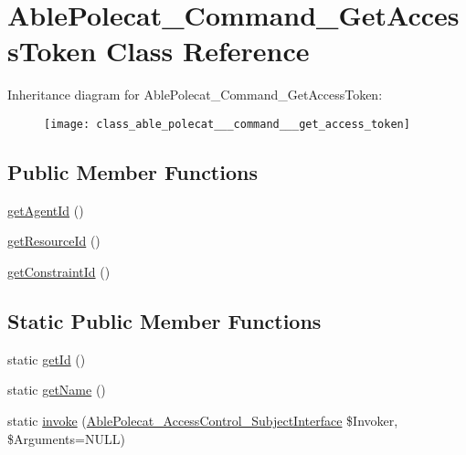 \hypertarget{class_able_polecat___command___get_access_token}{}\section{Able\+Polecat\+\_\+\+Command\+\_\+\+Get\+Access\+Token Class Reference}
\label{class_able_polecat___command___get_access_token}
Inheritance diagram for Able\+Polecat\+\_\+\+Command\+\_\+\+Get\+Access\+Token\+:\begin{figure}[H]
\begin{center}
\leavevmode
\texttt{[image: class\_able\_polecat\_\_\_command\_\_\_get\_access\_token]}
\end{center}
\end{figure}
\subsection*{Public Member Functions}
\begin{DoxyCompactItemize}
\item 
\hyperlink{class_able_polecat___command___get_access_token_a674eb8d41b003dc1c17e4296a8c9e9f8}{get\+Agent\+Id} ()
\item 
\hyperlink{class_able_polecat___command___get_access_token_a0ac412173b2b1d569ef90a1ac095ca5d}{get\+Resource\+Id} ()
\item 
\hyperlink{class_able_polecat___command___get_access_token_a3ec916f4d406909dd28fd67457e86c29}{get\+Constraint\+Id} ()
\end{DoxyCompactItemize}
\subsection*{Static Public Member Functions}
\begin{DoxyCompactItemize}
\item 
static \hyperlink{class_able_polecat___command___get_access_token_acfaa3a96d0cb5a4c0d4d710dcba41e9e}{get\+Id} ()
\item 
static \hyperlink{class_able_polecat___command___get_access_token_a4ef9bd37ba3ce8a13c1e8bcf4f72a630}{get\+Name} ()
\item 
static \hyperlink{class_able_polecat___command___get_access_token_a6821480fe527af0afdf3691d7cffad5f}{invoke} (\hyperlink{interface_able_polecat___access_control___subject_interface}{Able\+Polecat\+\_\+\+Access\+Control\+\_\+\+Subject\+Interface} \$Invoker, \$Arguments=N\+U\+L\+L)
\end{DoxyCompactItemize}
